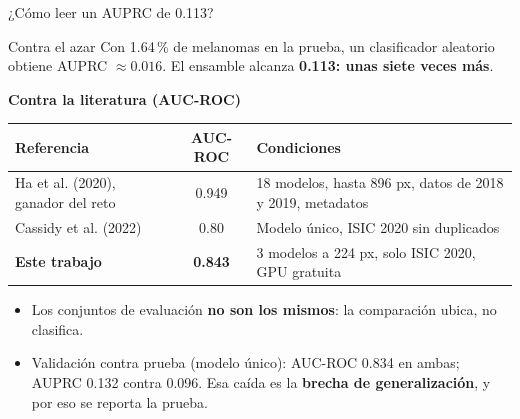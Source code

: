 \documentclass[aspectratio=169,10pt]{beamer}
\begin{document}
\begin{frame}{¿Cómo leer un AUPRC de 0.113?}
  \begin{block}{Contra el azar}
    Con 1.64\,\% de melanomas en la prueba, un clasificador aleatorio obtiene AUPRC $\approx 0.016$. El ensamble alcanza \textbf{0.113: unas siete veces más}.
  \end{block}
  \vspace{0.5em}
  \textbf{Contra la literatura (AUC-ROC)}
  \begin{center}
    \small
    \begin{tabular}{lcl}
      \toprule
      \textbf{Referencia} & \textbf{AUC-ROC} & \textbf{Condiciones} \\
      \midrule
      Ha et al. (2020), ganador del reto & 0.949 & 18 modelos, hasta 896 px, datos de 2018 y 2019, metadatos \\
      Cassidy et al. (2022) & 0.80 & Modelo único, ISIC 2020 sin duplicados \\
      \textbf{Este trabajo} & \textbf{0.843} & 3 modelos a 224 px, solo ISIC 2020, GPU gratuita \\
      \bottomrule
    \end{tabular}
  \end{center}
  \vspace{0.3em}
  \begin{itemize}
    \item Los conjuntos de evaluación \textbf{no son los mismos}: la comparación ubica, no clasifica.
    \item Validación contra prueba (modelo único): AUC-ROC 0.834 en ambas; AUPRC 0.132 contra 0.096. Esa caída es la \textbf{brecha de generalización}, y por eso se reporta la prueba.
  \end{itemize}
\end{frame}
\end{document}
